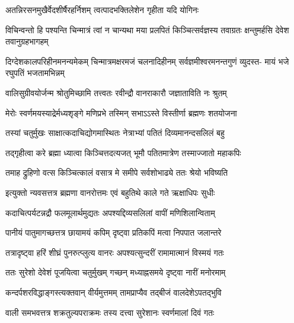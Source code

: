 \twolineshloka
{अतन्निरसनमुखैर्वेदशीर्षैरहर्निशम्}
{त्वत्पादभक्तिलेशेन गृहीता यदि योगिनः} %

\threelineshloka
{विचिन्वन्तो हि पश्यन्ति चिन्मात्रं त्वां न चान्यथा}
{मया प्रलपितं किञ्चित्सर्वज्ञस्य तवाग्रतः}
{क्षन्तुमर्हसि देवेश तवानुग्रहभागहम्} %

\fourlineindentedshloka
{दिग्देशकालपरिहीनमनन्यमेकम्}
{चिन्मात्रमक्षरमजं चलनादिहीनम्}
{सर्वज्ञमीश्वरमनन्तगुणं व्युदस्त-}
{मायं भजे रघुपतिं भजतामभिन्नम्} %






\twolineshloka
{वालिसुग्रीवयोर्जन्म श्रोतुमिच्छामि तत्त्वतः}
{रवीन्द्रौ वानराकारौ जज्ञाताविति नः श्रुतम्} %


\twolineshloka
{मेरोः स्वर्णमयस्याद्रेर्मध्यशृङ्गे मणिप्रभे}
{तस्मिन् सभाऽऽस्ते विस्तीर्णा ब्रह्मणः शतयोजना} %

\twolineshloka
{तस्यां चतुर्मुखः साक्षात्कदाचिद्योगमास्थितः}
{नेत्राभ्यां पतितं दिव्यमानन्दसलिलं बहु} %

\twolineshloka
{तद्गृहीत्वा करे ब्रह्मा ध्यात्वा किञ्चित्तदत्यजत्}
{भूमौ पतितमात्रेण तस्माज्जातो महाकपिः} %

\twolineshloka
{तमाह द्रुहिणो वत्स किञ्चित्कालं वसात्र मे}
{समीपे सर्वशोभाढ्ये ततः श्रेयो भविष्यति} %

\twolineshloka
{इत्युक्तो न्यवसत्तत्र ब्रह्मणा वानरोत्तमः}
{एवं बहुतिथे काले गते ऋक्षाधिपः सुधीः} %

\twolineshloka
{कदाचित्पर्यटन्नद्रौ फलमूलार्थमुद्यतः}
{अपश्यद्दिव्यसलिलां वापीं मणिशिलान्विताम्} %

\twolineshloka
{पानीयं पातुमागच्छत्तत्र छायामयं कपिम्}
{दृष्ट्वा प्रतिकपिं मत्वा निपपात जलान्तरे} %

\twolineshloka
{तत्रादृष्ट्वा हरिं शीघ्रं पुनरुत्प्लुत्य वानरः}
{अपश्यत्सुन्दरीं रामामात्मानं विस्मयं गतः} %

\twolineshloka
{ततः सुरेशो देवेशं पूजयित्वा चतुर्मुखम्}
{गच्छन् मध्याह्नसमये दृष्ट्वा नारीं मनोरमाम्} %

\twolineshloka
{कन्दर्पशरविद्धाङ्गस्त्यक्तवान् वीर्यमुत्तमम्}
{तामप्राप्यैव तद्बीजं वालदेशेऽपतद्भुवि} %

\twolineshloka
{वाली समभवत्तत्र शक्रतुल्यपराक्रमः}
{तस्य दत्त्वा सुरेशानः स्वर्णमालां दिवं गतः} %

